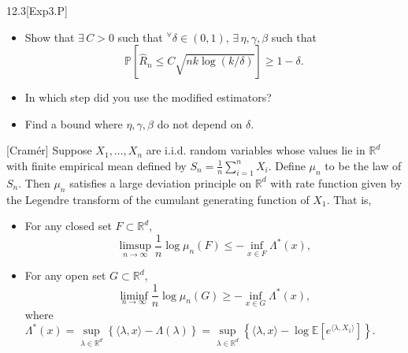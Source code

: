 \documentclass[10pt]{article}
\newenvironment{theorem*}[1]{%
  \IfBlankTF{#1}
    {\renewcommand{\themanualtheoreminner}{\unskip}}
    {\renewcommand\themanualtheoreminner{#1}}%
  \manualtheoreminner
}{\endmanualtheoreminner}
\theoremstyle{definition}
\newenvironment{exercise*}[1]{%
  \IfBlankTF{#1}
    {\renewcommand{\themanualexerciseinner}{\unskip}}
    {\renewcommand\themanualexerciseinner{#1}}%
  \manualexerciseinner
}{\endmanualexerciseinner}
\begin{document}
\begin{exercise*}{12.3}[Exp3.P]
\begin{itemize}
        \begin{equation*}
            \mathbb{P}\left[\sum_{t=1}^n \frac{1}{P_{t, A_t}} \geq 2nk + \frac{k}{\gamma} \log\left(\frac{1}{\delta}\right)\right] \leq \delta.
        \end{equation*}
        \begin{equation*}
            \mathbb{P}\left[\sum_{t=1}^n \hat{Y}_{ti} - y_{ti} \geq \frac{1}{\beta} \log\left(\frac{1}{\delta}\right)\right] \leq \delta.
        \end{equation*}
        \item[(f)] Show that $\exists \, C>0$ such that $^\forall \delta \in (0,1), \, \exists \, \eta, \gamma, \beta$ such that
        \begin{equation*}
            \mathbb{P}\left[\hat{R}_n \leq C \sqrt{nk\log(k/\delta)}\right] \geq 1-\delta.
        \end{equation*}
        \item[(g)] In which step did you use the modified estimators?
        \item[(h)] Find a bound where $\eta, \gamma, \beta$ do not depend on $\delta$.
    \end{itemize}
\end{exercise*}
\begin{theorem*}{}[Cramér]
    Suppose $X_1, \ldots, X_n$ are i.i.d. random variables whose values lie in $\mathbb{R}^d$ with finite empirical mean defined by $S_n = \frac{1}{n} \sum_{i=1}^n X_i$.
    Define $\mu_n$ to be the law of $S_n$.
    Then $\mu_n$ satisfies a large deviation principle on $\mathbb{R}^d$ with rate function given by the Legendre transform of the cumulant generating function of $X_1$.
    That is,
    \begin{itemize}
        \item For any closed set $F \subset \mathbb{R}^d$,
        \begin{equation*}
            \limsup_{n \to \infty} \frac{1}{n} \log \mu_n(F) \leq -\inf_{x \in F} \Lambda^*(x),
        \end{equation*}
        \item For any open set $G \subset \mathbb{R}^d$,
        \begin{equation*}
            \liminf_{n \to \infty} \frac{1}{n} \log \mu_n(G) \geq -\inf_{x \in G} \Lambda^*(x),
        \end{equation*}
    where $\Lambda^*(x) 
    = \sup\limits_{\lambda \in \mathbb{R}^d} \left\{ \langle \lambda, x \rangle - \Lambda(\lambda) \right\} 
    = \sup\limits_{\lambda \in \mathbb{R}^d} \left\{ \langle \lambda, x \rangle - \log \mathbb{E}\left[e^{\langle \lambda, X_1 \rangle}\right] \right\}$.
    \end{itemize}
\end{theorem*}
\end{document}
